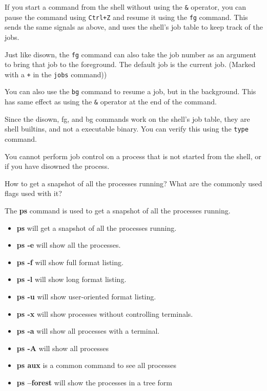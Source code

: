 If you start a command from the shell without using the \texttt{\&} operator,
you can pause the command using \texttt{Ctrl+Z} and resume it using the
\texttt{fg} command.
This sends the same signals as above, and uses the shell's job table
to keep track of the jobs.

\begin{remark}
  Just like disown, the \texttt{fg} command can also take the job number
  as an argument to bring that job to the foreground. The default job
  is the current job. (Marked with a \texttt{+} in the \texttt{jobs} command))
\end{remark}

You can also use the \texttt{bg} command to resume a job, but in the background.
This has same effect as using the \texttt{\&} operator at the end of the command.

\begin{remark}
  Since the disown, fg, and bg commands work on the shell's job table,
  they are shell builtins, and not a executable binary.
  You can verify this using the \texttt{type} command.
\end{remark}

You cannot perform job control on a process that is not started from the shell,
or if you have disowned the process.






\vfill
\pagebreak

\begin{qs}
  How to get a snapshot of all the processes running?
  What are the commonly used flags used with it?
\end{qs}

\begin{ans}
  The \textbf{ps} command is used to get a snapshot of all the processes running.
  \begin{itemize}
    \item \textbf{ps} will get a snapshot of all the processes running.
    \item \textbf{ps -e} will show all the processes.
    \item \textbf{ps -f} will show full format listing.
    \item \textbf{ps -l} will show long format listing.
    \item \textbf{ps -u} will show user-oriented format listing.
    \item \textbf{ps -x} will show processes without controlling terminals.
    \item \textbf{ps -a} will show all processes with a terminal.
    \item \textbf{ps -A} will show all processes
    \item \textbf{ps aux} is a common command to see all processes
    \item \textbf{ps --forest} will show the processes in a tree form
  \end{itemize}
\end{ans}
